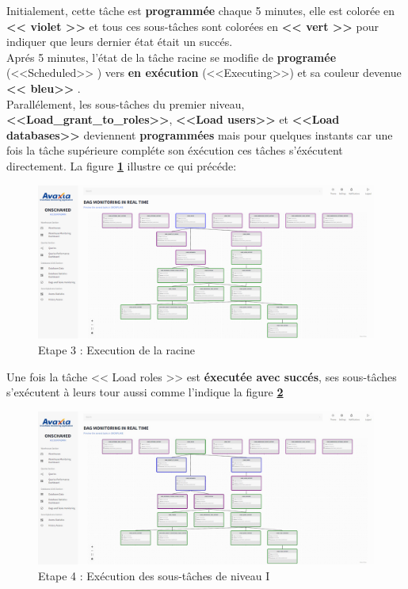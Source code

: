 Initialement, cette tâche est \textbf{programmée} chaque 5 minutes, elle est colorée en \textbf{<< violet >>} et tous ces sous-tâches sont colorées en \textbf{<< vert >>} pour indiquer que leurs dernier état était un succés. \\
Aprés 5 minutes, l'état de la tâche racine se modifie de \textbf{programée} (<<Scheduled>> ) vers \textbf{en exécution} (<<Executing>>) et sa couleur devenue \textbf{<< bleu>> }. \\
Parallélement, les sous-tâches du premier niveau, \textbf{<<Load\_grant\_to\_roles>>}, \textbf{<<Load users>>} et \textbf{<<Load databases>>} deviennent \textbf{programmées} mais pour quelques instants car une fois la tâche supérieure compléte son éxécution ces tâches s'éxécutent directement.
La figure \textbf{\ref{fig:executing}} illustre ce qui précéde:
    \begin{figure}[H]
    \centering
    \includegraphics[width =1\linewidth]{img/captures/dag/final/1.png}
    \caption{Etape 3 : Execution de la racine}
    \label{fig:executing}
    \end{figure}
\par Une fois la tâche << Load roles >> est \textbf{éxecutée avec succés}, ses sous-tâches s'exécutent à leurs tour aussi comme l'indique la figure \textbf{\ref{fig:success}}
\begin{figure}[H]
    \centering
    \includegraphics[width =1\linewidth]{img/captures/dag/final/2.jpg}
    \caption{Etape 4 : Exécution des sous-tâches de niveau I}
    \label{fig:success}
    \end{figure}

